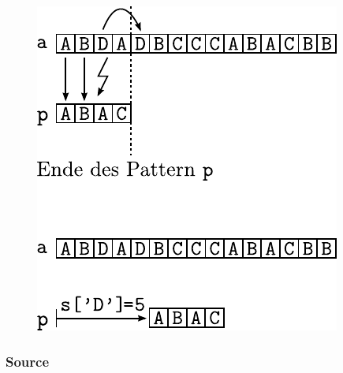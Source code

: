 \begin{figure}[h!]
	\centering
	\includegraphics[scale=0.9]{quicksearch-7.pdf}
\end{figure}

\subsubsection{Source}




